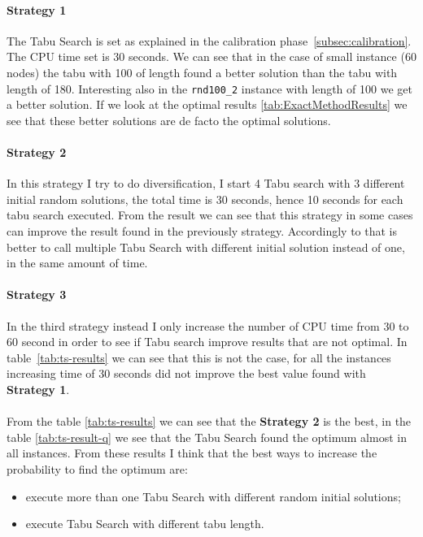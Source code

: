 		\paragraph{Strategy 1} The Tabu Search is set as explained in the calibration phase~\ref{subsec:calibration}. The CPU time set is 30 seconds. We can see that in the case of small instance (60 nodes) the tabu with 100 of length found a better solution than the tabu with length of 180. Interesting also in the \verb|rnd100_2| instance with length of 100 we get a better solution. If we look at the optimal results \ref{tab:ExactMethodResults} we see that these better solutions are de facto the optimal solutions.
		
		\paragraph{Strategy 2} In this strategy I try to do diversification, I start 4 Tabu search with 3 different initial random solutions, the total time is 30 seconds, hence 10 seconds for each tabu search executed. From the result we can see that this strategy in some cases can improve the result found in the previously strategy. Accordingly to that is better to call multiple Tabu Search with different initial solution instead of one, in the same amount of time.
		
		\paragraph{Strategy 3} In the third strategy instead I only increase the number of CPU time from 30 to 60 second in order to see if Tabu search improve results that are not optimal. In table~\ref{tab:ts-results} we can see that this is not the case, for all the instances increasing  time of 30 seconds did not improve the best value found with \textbf{Strategy 1}.
		
		\paragraph*{} From the table \ref{tab:ts-results} we can see that the \textbf{Strategy 2} is the best, in the table \ref{tab:ts-result-q} we see that the Tabu Search found the optimum almost in all instances. From these results I think that the best ways to increase the probability to find the optimum are:
		\begin{itemize}
			\item execute more than one Tabu Search with different random initial solutions;
			\item execute Tabu Search with different tabu length.
		\end{itemize}
		
